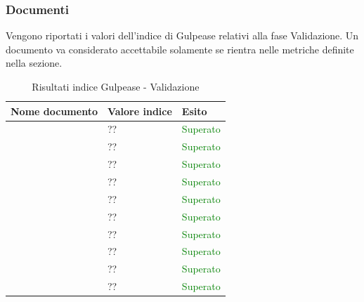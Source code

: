 	 	\subsubsection{Documenti}	 	
	 	Vengono riportati i valori dell'indice di Gulpease relativi alla fase Validazione. Un documento va considerato accettabile solamente se rientra nelle metriche definite nella sezione.
		\begin{table}[!ht]
			\begin{center}
				\begin{tabularx}{0.9\textwidth}{|l|l|X|}
					\hline
					\textbf{Nome documento} & \textbf{Valore indice} & \textbf{Esito}\\
					\hline						
					\docNameVersionAdR & ?? & \textcolor{green}{Superato}\\
					\hline
					\docNameVersionDdP & ?? & \textcolor{green}{Superato}\\
					\hline
					\docNameVersionGlo & ?? & \textcolor{green}{Superato}\\
					\hline					
					\docNameVersionNdP & ?? & \textcolor{green}{Superato}\\
					\hline					
					\docNameVersionPdP & ?? & \textcolor{green}{Superato}\\
					\hline					
					\docNameVersionPdQ & ?? & \textcolor{green}{Superato}\\
					\hline					
					\docNameVersionSdF & ?? & \textcolor{green}{Superato}\\
					\hline	
					\docNameVersionST & ?? & \textcolor{green}{Superato}\\
					\hline			
					\docVersionMA & ?? & \textcolor{green}{Superato}\\
					\hline
					\docVersionMU & ?? & \textcolor{green}{Superato}\\		
					\hline
				\end{tabularx}
			\end{center}
			\caption{Risultati indice Gulpease - Validazione}
		\end{table}
		
